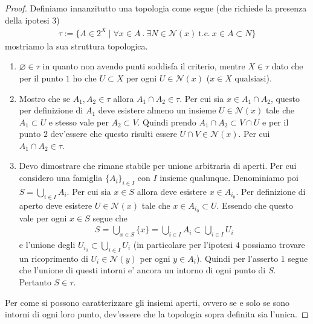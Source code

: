\begin{proof}
	Definiamo innanzitutto una topologia come segue (che richiede la presenza della ipotesi $3$)
	\begin{equation}
	\begin{aligned}
		\tau := \{ A \in 2^X \mid \forall x \in A\ . \ \exists N \in \mathcal{N}(x)\ \text{t.c.}\ x \in A \subset N \}
	\end{aligned}
	\end{equation}
	mostriamo la sua struttura topologica.
	\begin{enumerate}
		\item $\varnothing \in \tau$ in quanto non avendo punti soddisfa il criterio, mentre $X \in \tau$ dato che per il punto $1$ ho che $U \subset X$ per ogni $U \in \mathcal{N}(x)$ ($x \in X$ qualsiasi).
		\item Mostro che se $A_1, A_2 \in \tau$ allora $A_1 \cap A_2 \in \tau$. Per cui sia $x \in A_1 \cap A_2$, questo per definizione di $A_1$ deve esistere almeno un insieme $U \in \mathcal{N}(x)$ tale che $A_1\subset U$ e stesso vale per $A_2 \subset V$. Quindi prendo $A_1 \cap A_2 \subset V \cap U$ e per il punto $2$ dev'essere che questo risulti essere $U \cap V \in \mathcal{N}(x)$. Per cui $A_1 \cap A_2 \in \tau$.
		\item Devo dimostrare che rimane stabile per unione arbitraria di aperti. Per cui considero una famiglia $\{A_i\}_{i \in I}$ con $I$ insieme qualunque. Denominiamo poi $S = \bigcup_{i \in I} A_i$. Per cui sia $x \in S$ allora deve esistere $x \in A_{i_0}$. Per definizione di aperto deve esistere $U\in \mathcal{N}(x)$ tale che $x \in A_{i_0} \subset U$. Essendo che questo vale per ogni $x \in S$ segue che
		\begin{equation}
		\begin{aligned}
			S = \bigcup_{x \in S} \{x\} = \bigcup_{i \in I} A_i \subset \bigcup_{i \in I} U_i
		\end{aligned}
		\end{equation}
		e l'unione degli $U_{i_0} \subset \bigcup_{i \in I} U_i$ (in particolare per l'ipotesi $4$ possiamo trovare un ricoprimento di $U_i \in \mathcal{N}(y)$ per ogni $y \in A_i$). Quindi per l'asserto $1$ segue che l'unione di questi intorni e' ancora un intorno di ogni punto di $S$. Pertanto $S \in \tau$.
	\end{enumerate}
	Per come si possono caratterizzare gli insiemi aperti, ovvero se e solo se sono intorni di ogni loro punto, dev'essere che la topologia sopra definita sia l'unica.  
\end{proof}

